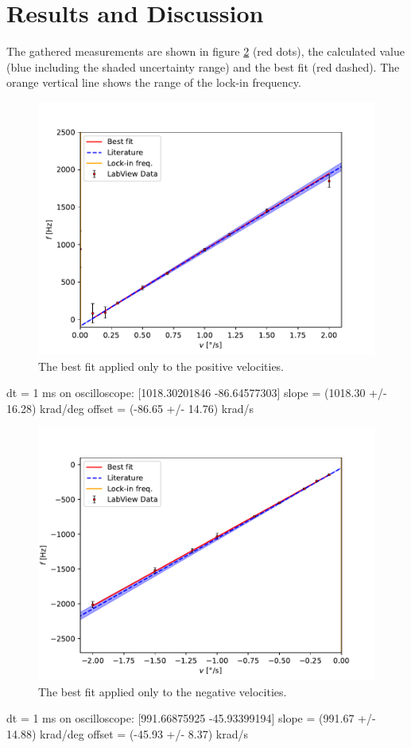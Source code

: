 \newpage
\section{Results and Discussion} \label{sec:results}
The gathered measurements are shown in figure \ref{fig:measurements} (red dots), the calculated value (blue including the shaded uncertainty range) and the best fit (red dashed). The orange vertical line shows the range of the lock-in frequency.
\begin{figure}[h!]
    \centering
    \includegraphics[width=\textwidth]{Gyroscope/Report/plots/slope_pos.pdf}
    \caption{The best fit applied only to the positive velocities.}
    \label{fig:measurements}
\end{figure}
dt = 1 ms on oscilloscope:
[1018.30201846  -86.64577303]
slope = (1018.30 +/- 16.28) krad/deg
offset = (-86.65 +/- 14.76) krad/s
\begin{figure}[h!]
    \centering
    \includegraphics[width=\textwidth]{Gyroscope/Report/plots/slope_neg.pdf}
    \caption{The best fit applied only to the negative velocities.}
    \label{fig:measurements}
\end{figure}
dt = 1 ms on oscilloscope:
[991.66875925 -45.93399194]
slope = (991.67 +/- 14.88) krad/deg
offset = (-45.93 +/- 8.37) krad/s

